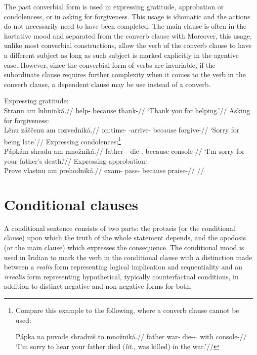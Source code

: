 The past converbial form is used in expressing gratitude, approbation or condolencess, or in asking for forgiveness. This usage is idiomatic and the actions do not necessarily need to have been completed. The main clause is often in the hortative mood and separated from the converb clause with  Moreover, this usage, unlike most converbial constructions, allow the verb of the converb clause to have a different subject as long as such subject is marked explicitly in the agentive case. However, since the converbial form of verbs are invariable, if the subordinate clause requires further complexity when it comes to the verb in the converb clause, a dependent  clause may be use instead of a converb.

\pex
\a Expressing gratitude:\\
\begingl
\gla Stranu am luhninká.//
\glb help- because thank-//
\glft `Thank you for helping.'//
\endgl
\a Asking for forgiveness:\\
\begingl
\gla Lěnu záščenu am rozvedniká.//
\glb on:time-\Ins{} \Neg{}-arrive- because forgive-//
\glft `Sorry for being late.'//
\endgl
\a Expressing condolences:\footnote{Compare this example to the following, where a converb clause cannot be used:

\ex[lingstyle=fnex,belowexskip=-1em]
\begingl
\gla Pápka na puvode shradniš to množniká.//
\glb father \Loc{} war-\Acc{} die-\Pv{}-\Subj.\Pf{} \Rz{} with console-//
\glft `I'm sorry to hear your father died (\emph{lit.,} was killed) in the war.'//
\endgl\xe}\\
\begingl
\gla Pápkám shradu am množniká.//
\glb father-\Dim{}-\Agt{} die-\Cv{}.\Pf{} because console-//
\glft `I'm sorry for your father's death.'//
\endgl
\a Expressing approbation:\\
\begingl
\gla Prove vlastnu am prehodniká.//
\glb exam-\Acc{} pass- because praise-//
\glft {}//
\endgl
\xe

\section{Conditional clauses}

A conditional sentence consists of two parts: the protasis (or the conditional clause) upon which the truth of the whole statement depends, and the apodosis (or the main clause) which expresses the consequence. The conditional mood is used in Iridian to mark the verb in the conditional clause with a distinction made between a \emph{realis} form representing logical implication and sequentiality and an \emph{irrealis} form representing hypothetical, typically counterfactual conditions, in addition to distinct negative and non-negative forms for both.

